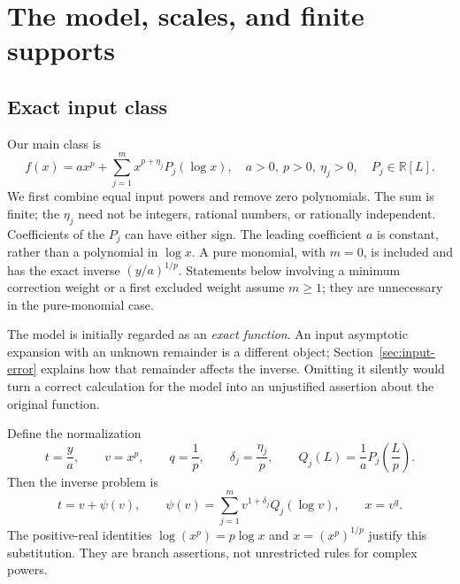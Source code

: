 \documentclass[11pt,a4paper]{article}
\numberwithin{equation}{section}
\theoremstyle{definition}
\newcommand{\R}{\mathbb R}
\begin{document}
\section{The model, scales, and finite supports}\label{sec:scale}

\subsection{Exact input class}
Our main class is
\begin{equation}\label{eq:model}
 f(x)=a x^p+\sum_{j=1}^m x^{p+\eta_j}P_j(\log x),
 \quad a>0,\ p>0,\ \eta_j>0,\quad P_j\in\R[L].
\end{equation}
We first combine equal input powers and remove zero polynomials.
The sum is finite; the $\eta_j$ need not be integers, rational numbers,
or rationally independent. Coefficients of the $P_j$ can have either sign.
The leading coefficient $a$ is constant, rather than a polynomial in
$\log x$. A pure monomial, with $m=0$, is included and has the exact inverse
$(y/a)^{1/p}$. Statements below involving a minimum correction weight
or a first excluded weight assume $m\ge1$; they are unnecessary in
the pure-monomial case.

The model is initially regarded as an \emph{exact function}. An input
asymptotic expansion with an unknown remainder is a different object;
Section~\ref{sec:input-error} explains how that remainder affects the
inverse. Omitting it silently would turn a correct calculation for the
model into an unjustified assertion about the original function.

Define the normalization
\begin{equation}\label{eq:normalization}
 t=\frac ya,\qquad v=x^p,\qquad q=\frac1p,\qquad
 \delta_j=\frac{\eta_j}{p},\qquad
 Q_j(L)=\frac1a P_j\!\left(\frac Lp\right).
\end{equation}
Then the inverse problem is
\begin{equation}\label{eq:normalized}
 t=v+\psi(v),\qquad
 \psi(v)=\sum_{j=1}^m v^{1+\delta_j}Q_j(\log v),
 \qquad x=v^q.
\end{equation}
The positive-real identities $\log(x^p)=p\log x$ and
$x=(x^p)^{1/p}$ justify this substitution. They are branch assertions,
not unrestricted rules for complex powers.
\end{document}
